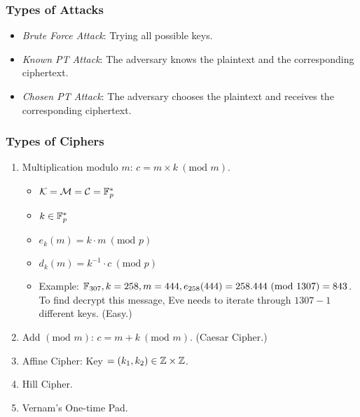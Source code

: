 \begin{center}
    \subsubsection{Types of Attacks}
\end{center}

\begin{itemize}
    \item \textit{Brute Force Attack}: Trying all possible keys.
    \item \textit{Known PT Attack}: The adversary knows the plaintext and the corresponding ciphertext.
    \item \textit{Chosen PT Attack}: The adversary chooses the plaintext and receives the corresponding ciphertext.
\end{itemize}

\begin{center}
    \subsubsection{Types of Ciphers}
\end{center}

\begin{enumerate}[label=\arabic*.]
    \item Multiplication modulo \(m\): \(c = m \times k \ (\text{mod } m)\). 
    \begin{itemize}
        \item \(\mathcal{K} = \mathcal{M} = \mathcal{C} = \mathbb{F}_p^*\)
        \item \(k \in \mathbb{F}_p^*\)
        \item \(e_k(m) = k \cdot m \ (\text{mod } p)\)
        \item \(d_k(m) = k^{-1} \cdot c \ (\text{mod } p)\)
        \item Example: \(\mathbb{F}_{307}, k = 258, m = 444, e_{258}(444) = 258.444 \ (\text{mod } 1307) = 843\). To find decrypt this message, Eve needs to iterate through \(1307 - 1\) different keys. (Easy.)
    \end{itemize}
    \item Add \((\text{mod } m)\): \(c = m + k \ (\text{mod } m)\). (Caesar Cipher.)
    \item Affine Cipher: Key \(= (k_1,k_2) \in \mathbb{Z} \times \mathbb{Z}\).
    \item Hill Cipher.
    \item Vernam's One-time Pad.
\end{enumerate}


